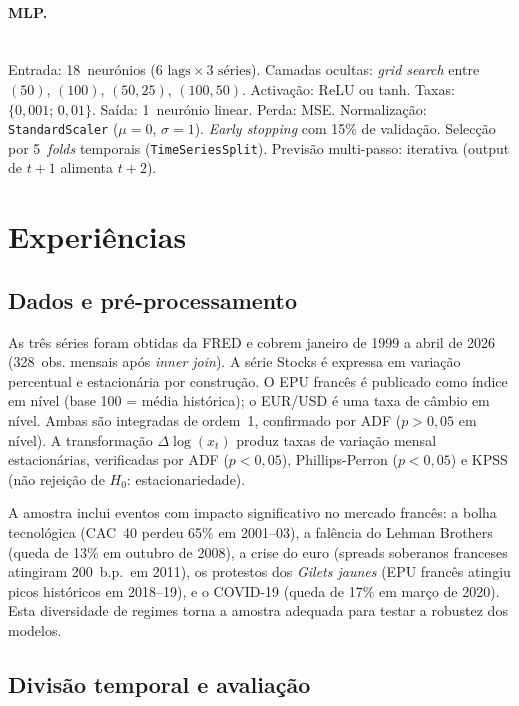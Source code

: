 \documentclass[12pt,a4paper]{article}
\begin{document}
\paragraph{MLP.} \mbox{}\\ Entrada: 18~neurónios ($6\text{ lags} \times 3\text{ séries}$). Camadas ocultas: \textit{grid search} entre $(50)$, $(100)$, $(50{,}25)$, $(100{,}50)$. Activação: ReLU ou tanh. Taxas: $\{0{,}001;\,0{,}01\}$. Saída: 1~neurónio linear. Perda: MSE. Normalização: \texttt{StandardScaler} ($\mu{=}0$, $\sigma{=}1$). \textit{Early stopping} com 15\% de validação. Selecção por 5~\textit{folds} temporais (\texttt{TimeSeriesSplit}). Previsão multi-passo: iterativa (output de $t{+}1$ alimenta $t{+}2$).

\section{Experiências}

\subsection{Dados e pré-processamento}

As três séries foram obtidas da FRED e cobrem janeiro de 1999 a abril de 2026 (328~obs. mensais após \textit{inner join}). A série Stocks é expressa em variação percentual e estacionária por construção. O EPU francês é publicado como índice em nível (base 100 = média histórica); o EUR/USD é uma taxa de câmbio em nível. Ambas são integradas de ordem~1, confirmado por ADF ($p > 0{,}05$ em nível). A transformação $\Delta\log(x_t)$ produz taxas de variação mensal estacionárias, verificadas por ADF ($p < 0{,}05$), Phillips-Perron ($p < 0{,}05$) e KPSS (não rejeição de $H_0$: estacionariedade).

A amostra inclui eventos com impacto significativo no mercado francês: a bolha tecnológica (CAC~40 perdeu 65\% em 2001--03), a falência do Lehman Brothers (queda de 13\% em outubro de 2008), a crise do euro (spreads soberanos franceses atingiram 200~b.p.\ em 2011), os protestos dos \textit{Gilets jaunes} (EPU francês atingiu picos históricos em 2018--19), e o COVID-19 (queda de 17\% em março de 2020). Esta diversidade de regimes torna a amostra adequada para testar a robustez dos modelos.

\subsection{Divisão temporal e avaliação}
\end{document}
